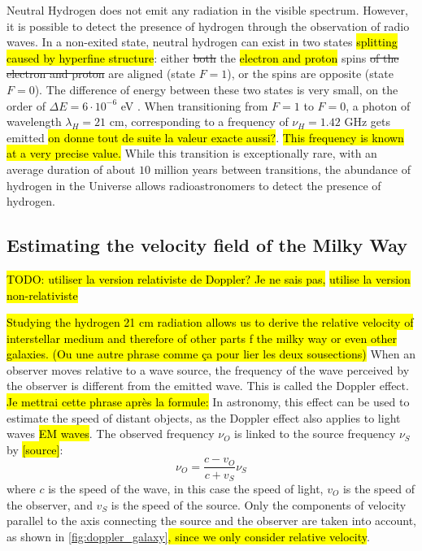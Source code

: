 Neutral Hydrogen does not emit any radiation in the visible spectrum.
However, it is possible to detect the presence of hydrogen through the observation of radio waves.
In a non-exited state, neutral hydrogen can exist in two states \hl{splitting caused by hyperfine structure}: either \st{both} the \hl{electron and proton} spins \st{of the electron and proton} are aligned (state $F=1$), or the spins are opposite (state $F=0$).
The difference of energy between these two states is very small, on the order of $\Delta E = 6 \cdot 10^{-6}$ \si{\electronvolt} \cite{frederic_courbin_introduction_nodate}.
When transitioning from $F=1$ to $F=0$, a photon of wavelength $\lambda_H = 21$ cm, corresponding to a frequency of $\nu_H = 1.42$ GHz gets emitted \hl{on donne tout de suite la valeur exacte aussi?}.
\hl{This frequency is known at a very precise value.}
While this transition is exceptionally rare, with an average duration of about $10$ million years between transitions, the abundance of hydrogen in the Universe allows radioastronomers to detect the presence of hydrogen.



\subsection{Estimating the velocity field of the Milky Way}
\hl{TODO: utiliser la version relativiste de Doppler? Je ne sais pas,} \cite{lauterbach_radio_2022} \hl{utilise la version non-relativiste}

\hl{Studying the hydrogen 21 cm radiation allows us to derive the relative velocity of interstellar medium and therefore of other parts f the milky way or even other galaxies. (Ou une autre phrase comme ça pour lier les deux sousections)}
When an observer moves relative to a wave source, the frequency of the wave perceived by the observer is different from the emitted wave.
This is called the Doppler effect.
\hl{Je mettrai cette phrase après la formule:} In astronomy, this effect can be used to estimate the speed of distant objects, as the Doppler effect also applies to light waves \hl{EM waves}.
The observed frequency $\nu_O$ is linked to the source frequency $\nu_S$ by \hl{[source]}:
\begin{equation}
    \nu_O = \frac{c - v_O}{c + v_S} \nu_S
\end{equation}
where $c$ is the speed of the wave, in this case the speed of light, $v_O$ is the speed of the observer, and $v_S$ is the speed of the source.
Only the components of velocity parallel to the axis connecting the source and the observer are taken into account, as shown in \autoref{fig:doppler_galaxy}\hl{, since we only consider relative velocity}.

